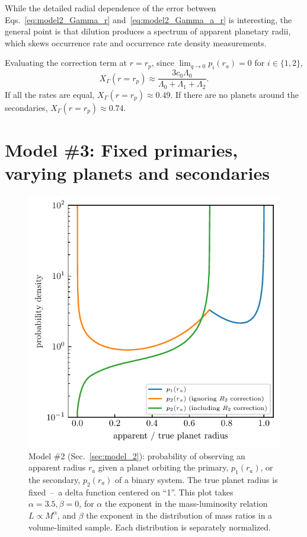 While the detailed radial dependence of the error between 
Eqs.~\ref{eq:model2_Gamma_r} 
and~\ref{eq:model2_Gamma_a_r} is interesting, the general point is
that dilution produces a spectrum of apparent planetary radii, which
skews occurrence rate and occurrence rate density measurements.

Evaluating the correction term at $r=r_p$, since $\lim_{q\rightarrow0} 
p_i(r_a)=0$ for $i\in\{1,2\}$,
\begin{equation}
X_\Gamma(r=r_p) \approx \frac{3c_0 \Lambda_0}{\Lambda_0+\Lambda_1+\Lambda_2}.
\end{equation}
If all the rates are equal, $X_\Gamma(r=r_p)\approx0.49$.
If there are no planets around the secondaries, $X_\Gamma(r=r_p)\approx0.74$.



\section{Model \#3: Fixed primaries, varying planets and secondaries}








\begin{figure}[!b]
    \begin{center}
        \includegraphics[width=.9\textwidth]{figures/prob_r_a.pdf}
    \end{center}
    \caption{Model \#2 (Sec.~\ref{sec:model_2}): 
    probability of observing an apparent radius $r_a$ given a 
    planet orbiting the primary, $p_1(r_a)$, or the secondary, $p_2(r_a)$ of a 
    binary system.
    The true planet radius is fixed~--~a delta function centered on ``1''.
    This plot takes $\alpha=3.5, \beta=0$, for $\alpha$ the exponent in 
    the mass-luminosity relation $L \propto M^\alpha$, and $\beta$ the 
    exponent in the distribution of mass ratios in a volume-limited sample.
    Each distribution is separately normalized.
    }
    \label{fig:model2_prob_r_a}
\end{figure}
